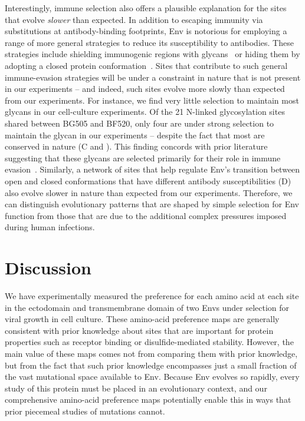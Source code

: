 \documentclass[9pt]{elife}
\begin{document}
Interestingly, immune selection also offers a plausible explanation for the sites that evolve \emph{slower} than expected.
In addition to escaping immunity via substitutions at antibody-binding footprints, Env is notorious for employing a range of more general strategies to reduce its susceptibility to antibodies.
These strategies include shielding immunogenic regions with glycans~\citep{wei2003antibody,stewart2016trimeric,gristick2016natively} or hiding them by adopting a closed protein conformation~\citep{kwong2002hiv,guttman2015antibody,ozorowski2017open}.
Sites that contribute to such general immune-evasion strategies will be under a constraint in nature that is not present in our experiments -- and indeed, such sites evolve more slowly than expected from our experiments.
For instance, we find very little selection to maintain most glycans in our cell-culture experiments.
Of the 21 N-linked glycosylation sites shared between BG505 and BF520, only four are under strong selection to maintain the glycan in our experiments -- despite the fact that most are conserved in nature (C and ). 
This finding concords with prior literature suggesting that these glycans are selected primarily for their role in immune evasion~\citep{pugach2004prolonged,wang2013systematic,rathore2017glycosylation}. 
Similarly, a network of sites that help regulate Env's transition between open and closed conformations that have different antibody susceptibilities (D) also evolve slower in nature than expected from our experiments.
Therefore, we can distinguish evolutionary patterns that are shaped by simple selection for Env function from those that are due to the additional complex pressures imposed during human infections. 

\section{Discussion}
We have experimentally measured the preference for each amino acid at each site in the ectodomain and transmembrane domain of two Envs under selection for viral growth in cell culture.
These amino-acid preference maps are generally consistent with prior knowledge about sites that are important for protein properties such as receptor binding or disulfide-mediated stability.
However, the main value of these maps comes not from comparing them with prior knowledge, but from the fact that such prior knowledge encompasses just a small fraction of the vast mutational space available to Env.
Because Env evolves so rapidly, every study of this protein must be placed in an evolutionary context, and our comprehensive amino-acid preference maps potentially enable this in ways that prior piecemeal studies of mutations cannot.
\end{document}
